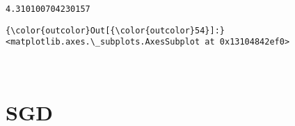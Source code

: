 \documentclass[11pt]{article}
\begin{document}
    \begin{Verbatim}[commandchars=\\\{\}]
4.310100704230157

    \end{Verbatim}

\begin{Verbatim}[commandchars=\\\{\}]
{\color{outcolor}Out[{\color{outcolor}54}]:} <matplotlib.axes.\_subplots.AxesSubplot at 0x13104842ef0>
\end{Verbatim}
            
    \begin{center}
    \end{center}
    { \hspace*{\fill} \\}
    
    \hypertarget{sgd}{%
\section{SGD}\label{sgd}}
\end{document}
